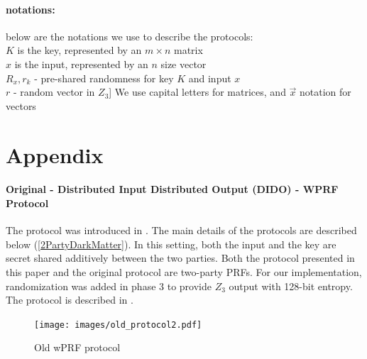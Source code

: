 \paragraph{notations:} below are the notations we use to describe the protocols: \\
$K$ is the key, represented by an $m \times n$ matrix \\
$x$ is the input, represented by an $n$ size vector \\
$R_x, r_k$ - pre-shared randomness for key $K$ and input $x$ \\
$r$ - random vector in $Z_3$]
We use capital letters for matrices, and $\vec{x}$ notation for vectors \\

\section{Appendix}

\paragraph{Original - Distributed Input Distributed Output (DIDO) - WPRF Protocol}

The protocol was introduced in \cite{darkmatter}. The main details of the protocols are described below (\ref{2PartyDarkMatter}). In this setting, both the input and the key are secret shared additively between the two parties. Both the protocol presented in this paper and the original protocol are two-party PRFs. For our implementation, randomization was added in phase 3 to provide $Z_3$ output with 128-bit entropy. 
The protocol is described in .

\begin{figure}[ht]
	\centering
	\texttt{[image: images/old\_protocol2.pdf]}
	\vspace{-2mm}
	\caption{Old wPRF protocol}
	\label{old_protocol.fig}
	\vspace{-5mm}
\end{figure}


